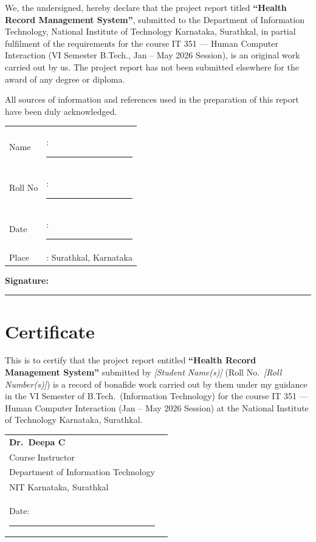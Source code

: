 \documentclass[12pt,a4paper]{report}
\begin{document}
We, the undersigned, hereby declare that the project report titled \textbf{``Health Record Management System''}, submitted to the Department of Information Technology, National Institute of Technology Karnataka, Surathkal, in partial fulfilment of the requirements for the course IT 351 — Human Computer Interaction (VI Semester B.Tech., Jan -- May 2026 Session), is an original work carried out by us. The project report has not been submitted elsewhere for the award of any degree or diploma.

All sources of information and references used in the preparation of this report have been duly acknowledged.

\vspace{2cm}
\noindent
\begin{tabular}{ll}
Name    & : \rule{6cm}{0.5pt}\\[12pt]
Roll No & : \rule{6cm}{0.5pt}\\[12pt]
Date    & : \rule{6cm}{0.5pt}\\[12pt]
Place   & : Surathkal, Karnataka
\end{tabular}

\vspace{1.5cm}
\noindent\textbf{Signature:}~~\rule{5cm}{0.5pt}

\chapter*{Certificate}

This is to certify that the project report entitled \textbf{``Health Record Management System''} submitted by \textit{[Student Name(s)]} (Roll No.\ \textit{[Roll Number(s)]}) is a record of bonafide work carried out by them under my guidance in the VI Semester of B.Tech.\ (Information Technology) for the course IT 351 — Human Computer Interaction (Jan -- May 2026 Session) at the National Institute of Technology Karnataka, Surathkal.

\vspace{2.5cm}
\noindent
\begin{tabular}{ll}
\textbf{Dr.\ Deepa C} & \\[4pt]
Course Instructor & \\[4pt]
Department of Information Technology & \\[4pt]
NIT Karnataka, Surathkal & \\[12pt]
Date: \rule{4cm}{0.5pt} &
\end{tabular}
\end{document}
